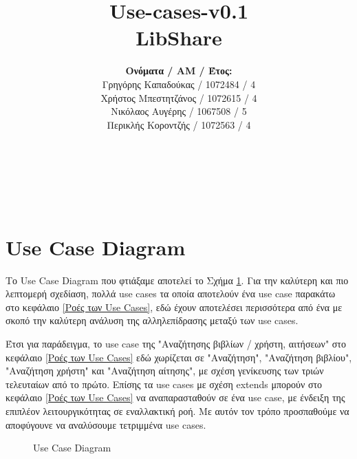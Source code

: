 \documentclass[12pt,a4paper]{article}
\title{Use-cases-v0.1 \\ LibShare}
\author{\textbf{Ονόματα / ΑΜ / Έτος:} \\ Γρηγόρης Καπαδούκας / 1072484 / 4\textdegree \\ Χρήστος Μπεστητζάνος / 1072615 / 4\textdegree \\ Νικόλαος Αυγέρης / 1067508 / 5\textdegree \\ Περικλής Κοροντζής / 1072563 / 4\textdegree}
\begin{document}
\makeatletter
\begin{center}
	\LARGE{\@title} \\
	\pagebreak
	\begin{LARGE}\@author\end{LARGE} \\
\end{center}
\pagebreak

\section{Use Case Diagram}

Το Use Case Diagram που φτιάξαμε αποτελεί το Σχήμα \ref{Use Case Diagram}. Για την καλύτερη και πιο λεπτομερή σχεδίαση, πολλά use cases τα οποία αποτελούν ένα use case παρακάτω στο κεφάλαιο \ref{Ροές των Use Cases}, εδώ έχουν αποτελέσει περισσότερα από ένα με σκοπό την καλύτερη ανάλυση της αλληλεπίδρασης μεταξύ των use cases.

Έτσι για παράδειγμα, το use case της "Αναζήτησης βιβλίων / χρήστη, αιτήσεων" στο κεφάλαιο \ref{Ροές των Use Cases} εδώ χωρίζεται σε "Αναζήτηση", "Αναζήτηση βιβλίου", "Αναζήτηση χρήστη" και "Αναζήτηση αίτησης", με σχέση γενίκευσης των τριών τελευταίων από το πρώτο. Επίσης τα use cases με σχέση extends μπορούν στο κεφάλαιο \ref{Ροές των Use Cases} να αναπαρασταθούν σε ένα use case, με ένδειξη της επιπλέον λειτουργικότητας σε εναλλακτική ροή. Με αυτόν τον τρόπο προσπαθούμε να αποφύγουνε να αναλύσουμε τετριμμένα use cases.

\begin{figure}[H]
	\caption{Use Case Diagram}
	\label{Use Case Diagram}
\end{figure}
\end{document}
